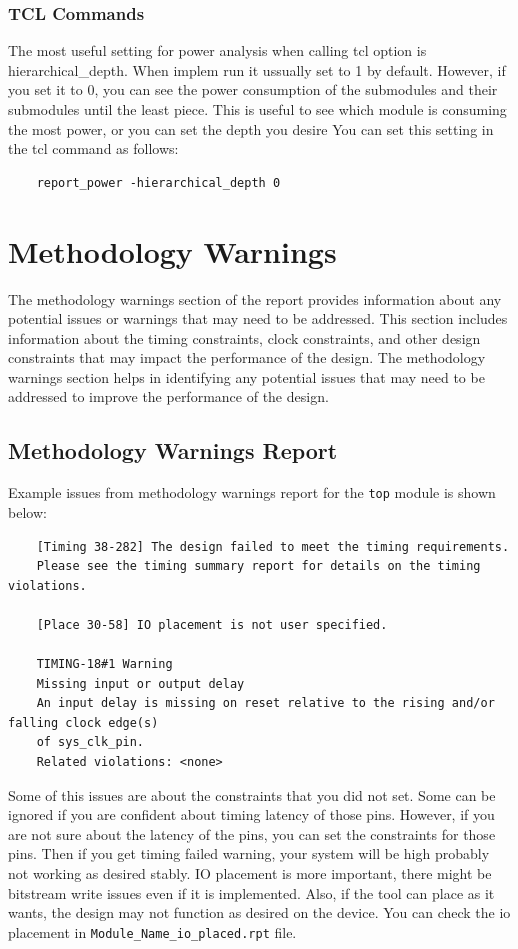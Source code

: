 \documentclass{report}
\begin{document}
\subsection{TCL Commands}
The most useful setting for power analysis when calling tcl option is hierarchical\_depth. When implem run it ussually set to 1 by default. However, if you set it to 0, you can see the power consumption of the submodules and their submodules until the least piece. This is useful to see which module is consuming the most power, or you can set the depth you desire You can set this setting in the tcl command as follows:

\begin{verbatim}
    report_power -hierarchical_depth 0
\end{verbatim}

\chapter{Methodology Warnings}
The methodology warnings section of the report provides information about any potential issues or warnings that may need to be addressed. This section includes information about the timing constraints, clock constraints, and other design constraints that may impact the performance of the design. The methodology warnings section helps in identifying any potential issues that may need to be addressed to improve the performance of the design.

\section{Methodology Warnings Report}
Example issues from methodology warnings report for the \texttt{top} module is shown below:
\begin{verbatim}
    [Timing 38-282] The design failed to meet the timing requirements. 
    Please see the timing summary report for details on the timing violations.

    [Place 30-58] IO placement is not user specified.

    TIMING-18#1 Warning
    Missing input or output delay  
    An input delay is missing on reset relative to the rising and/or falling clock edge(s) 
    of sys_clk_pin.
    Related violations: <none>
\end{verbatim}
Some of this issues are about the constraints that you did not set. Some can be ignored if you are confident about timing latency of those pins. However, if you are not sure about the latency of the pins, you can set the constraints for those pins. Then if you get timing failed warning, your system will be high probably not working as desired stably. IO placement is more important, there might be bitstream write issues even if it is implemented. Also, if the tool can place as it wants, the design may not function as desired on the device. You can check the io placement in \texttt{Module\_Name\_io\_placed.rpt} file.
\end{document}

